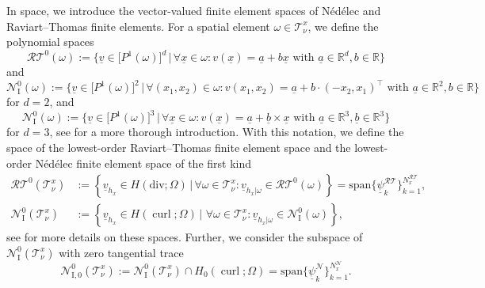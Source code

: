 \documentclass[a4paper,11pt]{article}
\newcommand{\R}{\mathbb R}
\newcommand{\cu}{\operatorname{curl}}
\renewcommand{\vec}[1]{\underline{#1}}
\begin{document}
In space, we introduce the vector-valued finite element spaces of Nédélec and Raviart--Thomas finite elements. For a spatial element $\omega \in \mathcal T^x_\nu$, we define the polynomial spaces
\begin{equation*}
	\mathcal{RT}^0(\omega) := \Big\{ \vec v \in \mathbb [P^1(\omega)]^d\,|\, \forall \vec x \in \omega: v(\vec x) = \vec a + b \vec x \text{ with } \vec a \in \R^d, b \in \R \Big\}
\end{equation*}
and
\begin{equation*}
	\mathcal N_\mathrm{I}^0(\omega) := \Big\{ \vec v \in \mathbb [P^1(\omega)]^2\,|\, \forall (x_1,x_2) \in \omega: v(x_1,x_2) = \vec a + b \cdot (-x_2,x_1)^\top \text{ with } \vec a \in \R^2, b \in \R \Big\}
\end{equation*}
for $d=2$, and
\begin{equation*}
	\mathcal N_\mathrm{I}^0(\omega) := \Big\{ \vec v \in \mathbb [P^1(\omega)]^3\,|\, \forall \vec x \in \omega: v(\vec x) = \vec a + \vec b \times \vec x
	\text{ with } \vec a \in \R^3, \vec b \in \R^3 \Big\}
\end{equation*}
for $d=3$, see \cite[Section~14.1, Section~15.1]{ErnGuermond2020I} for a more thorough introduction. With this notation, we define the space of the lowest-order Raviart--Thomas finite element space and the lowest-order Nédélec finite element space of the first kind
\begin{align*}
	\mathcal{RT}^0(\mathcal T^x_\nu) &:= \left\{ \vec v_{h_x} \in H(\mathrm{div};\Omega) \,| \, \forall \omega \in \mathcal T^x_\nu : \vec v_{h_x| \omega} \in \mathcal{RT}^0(\omega) \right\} = \mathrm{span} \{\vec \psi_k^{\mathcal{RT}} \}_{k=1}^{N_x^{\mathcal{RT}}},\\
	\mathcal N_\mathrm{I}^0(\mathcal T^x_\nu) &:= \left\{ \vec v_{h_x} \in H(\cu;\Omega) \,|\, \, \forall \omega \in \mathcal T^x_\nu : \vec v_{h_x| \omega} \in \mathcal N_\mathrm{I}^0(\omega) \right\},
\end{align*}
see  \cite{ErnGuermond2020I,Monk} for more details on these spaces. Further, we consider the subspace of $\mathcal N_\mathrm{I}^0(\mathcal T^x_\nu)$ with zero  tangential trace
\begin{equation*}
	\mathcal N_\mathrm{I,0}^0(\mathcal T^x_\nu) := \mathcal N_\mathrm{I}^0(\mathcal T^x_\nu) \cap H_0(\cu;\Omega) = \mathrm{span} \{\vec \psi_k^{\mathcal{N}} \}_{k=1}^{N_x^{\mathcal{N}}}.
\end{equation*}
\end{document}
